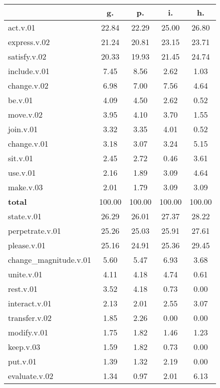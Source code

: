 \begin{table}[h!]
\begin{center}
\begin{tabular}{| l || c | c | c | c |}\hline
 & {\bf g.} & {\bf p.} & {\bf i.} & {\bf h.} \\\hline\hline
act.v.01 & 22.84  & 22.29  & 25.00  & 26.80 \\\hline
express.v.02 & 21.24  & 20.81  & 23.15  & 23.71 \\\hline
satisfy.v.02 & 20.33  & 19.93  & 21.45  & 24.74 \\\hline
include.v.01 & 7.45  & 8.56  & 2.62  & 1.03 \\\hline
change.v.02 & 6.98  & 7.00  & 7.56  & 4.64 \\\hline
be.v.01 & 4.09  & 4.50  & 2.62  & 0.52 \\\hline
move.v.02 & 3.95  & 4.10  & 3.70  & 1.55 \\\hline
join.v.01 & 3.32  & 3.35  & 4.01  & 0.52 \\\hline
change.v.01 & 3.18  & 3.07  & 3.24  & 5.15 \\\hline
sit.v.01 & 2.45  & 2.72  & 0.46  & 3.61 \\\hline
use.v.01 & 2.16  & 1.89  & 3.09  & 4.64 \\\hline
make.v.03 & 2.01  & 1.79  & 3.09  & 3.09 \\\hline\hline
{{\bf total}} & 100.00  & 100.00  & 100.00  & 100.00 \\\hline\hline\hline
state.v.01 & 26.29  & 26.01  & 27.37  & 28.22 \\\hline
perpetrate.v.01 & 25.26  & 25.03  & 25.91  & 27.61 \\\hline
please.v.01 & 25.16  & 24.91  & 25.36  & 29.45 \\\hline
change\_magnitude.v.01 & 5.60  & 5.47  & 6.93  & 3.68 \\\hline
unite.v.01 & 4.11  & 4.18  & 4.74  & 0.61 \\\hline
rest.v.01 & 3.52  & 4.18  & 0.73  & 0.00 \\\hline
interact.v.01 & 2.13  & 2.01  & 2.55  & 3.07 \\\hline
transfer.v.02 & 1.85  & 2.26  & 0.00  & 0.00 \\\hline
modify.v.01 & 1.75  & 1.82  & 1.46  & 1.23 \\\hline
keep.v.03 & 1.59  & 1.82  & 0.73  & 0.00 \\\hline
put.v.01 & 1.39  & 1.32  & 2.19  & 0.00 \\\hline
evaluate.v.02 & 1.34  & 0.97  & 2.01  & 6.13 \\\hline\hline

\end{tabular}
\end{center}
\end{table}
